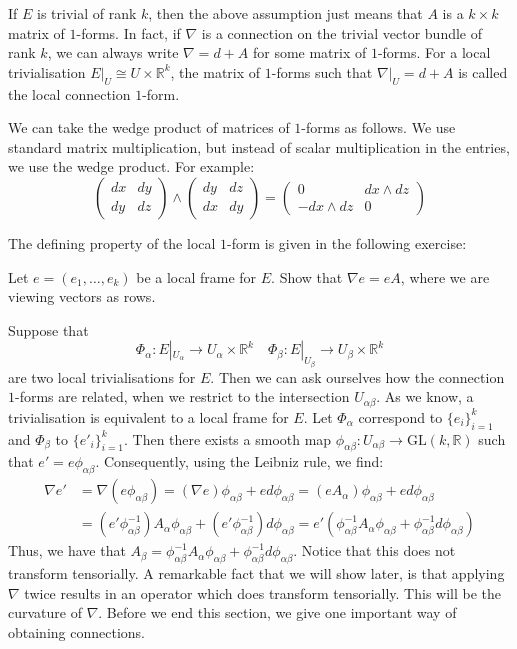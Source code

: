 If $E$ is trivial of rank $k$, then the above assumption just means that $A$ is a $k\times k$ matrix of $1$-forms. In fact, if $\nabla$ is a connection on the trivial vector bundle of rank $k$, we can always write $\nabla=d+A$ for some matrix of $1$-forms. For a local trivialisation $E|_U\cong U\times\mathbb{R}^k$, the matrix of $1$-forms such that $\nabla|_U=d+A$ is called the local connection $1$-form.
\begin{remark}
  We can take the wedge product of matrices of $1$-forms as follows. We use standard matrix multiplication, but instead of scalar multiplication in the entries, we use the wedge product. For example:
  $$\begin{pmatrix}dx & dy\\ dy & dz\end{pmatrix}\wedge\begin{pmatrix}dy & dz\\ dx & dy\end{pmatrix}=\begin{pmatrix}0 & dx\wedge dz\\ -dx\wedge dz & 0\end{pmatrix}$$
\end{remark}
The defining property of the local $1$-form is given in the following exercise:
\begin{exercise}\label{local}
  Let $e=(e_1,\dots,e_k)$ be a local frame for $E$. Show that $\nabla e=eA$, where we are viewing vectors as rows.
\end{exercise}
Suppose that
$$\Phi_\alpha:E|_{U_\alpha}\to U_\alpha\times\mathbb{R}^k\quad \Phi_\beta:E|_{U_\beta}\to U_\beta\times\mathbb{R}^k$$
are two local trivialisations for $E$. Then we can ask ourselves how the connection $1$-forms are related, when we restrict to the intersection $U_{\alpha\beta}$. As we know, a trivialisation is equivalent to a local frame for $E$. Let $\Phi_\alpha$ correspond to $\{e_i\}_{i=1}^k$ and $\Phi_\beta$ to $\{e'_i\}_{i=1}^k$. Then there exists a smooth map $\phi_{\alpha\beta}:U_{\alpha\beta}\to\text{GL}(k,\mathbb{R})$ such that $e'=e\phi_{\alpha\beta}$. Consequently, using the Leibniz rule, we find:
\begin{align*}
  \nabla e' &= \nabla (e\phi_{\alpha\beta})=(\nabla e)\phi_{\alpha\beta}+ed\phi_{\alpha\beta}=
  (eA_\alpha)\phi_{\alpha\beta}+ed\phi_{\alpha\beta} \\
            &= (e'\phi_{\alpha\beta}^{-1})A_\alpha\phi_{\alpha\beta}+(e'\phi_{\alpha\beta}^{-1})d\phi_{\alpha\beta}=e'(\phi_{\alpha\beta}^{-1}A_\alpha\phi_{\alpha\beta}+\phi_{\alpha\beta}^{-1}d\phi_{\alpha\beta})
\end{align*}
Thus, we have that $A_\beta=\phi_{\alpha\beta}^{-1}A_\alpha \phi_{\alpha\beta}+\phi_{\alpha\beta}^{-1}d\phi_{\alpha\beta}$. Notice that this does not transform tensorially. A remarkable fact that we will show later, is that applying $\nabla$ twice results in an operator which does transform tensorially. This will be the curvature of $\nabla$. Before we end this section, we give one important way of obtaining connections.

